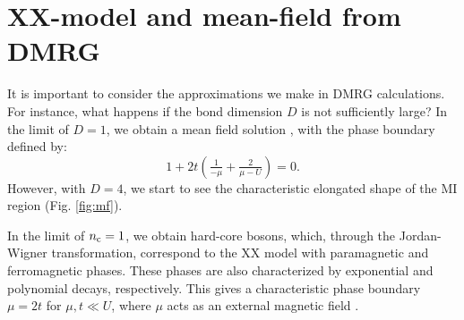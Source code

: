 



\section{XX-model and mean-field from DMRG}


It is important to consider the approximations we make in DMRG calculations. For instance, what happens if the bond dimension $D$ is not sufficiently large? In the limit of $D=1$, we obtain a mean field solution \cite{PhysRevB.40.546}, with the phase boundary defined by:
\begin{equation*}
	1 + 2t \left(\tfrac{1}{-\mu} + \tfrac{2}{\mu-U}\right) = 0.
\end{equation*}
However, with $D=4$, we start to see the characteristic elongated shape of the MI region (Fig. \ref{fig:mf}).

In the limit of $n_{\textnormal{c}}=1$, we obtain hard-core bosons, which, through the Jordan-Wigner transformation, correspond to the XX model  with paramagnetic and ferromagnetic phases. These phases are also characterized by exponential and polynomial decays, respectively. This gives a characteristic phase boundary $\mu=2t$ for $\mu, t \ll U$, where $\mu$ acts as an external magnetic field \cite{Mbeng_2024}.